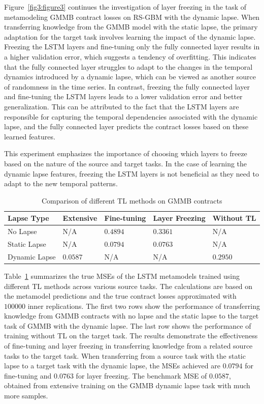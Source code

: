Figure~\ref{fig3:figure3} continues the investigation of layer freezing in the task of metamodeling GMMB contract losses on RS-GBM with the dynamic lapse. 
When transferring knowledge from the GMMB model with the static lapse, the primary adaptation for the target task involves learning the impact of the dynamic lapse.
Freezing the LSTM layers and fine-tuning only the fully connected layer results in a higher validation error, which suggests a tendency of overfitting.
This indicates that the fully connected layer struggles to adapt to the changes in the temporal dynamics introduced by a dynamic lapse, which can be viewed as another source of randomness in the time series.
In contrast, freezing the fully connected layer and fine-tuning the LSTM layers leads to a lower validation error and better generalization. 
This can be attributed to the fact that the LSTM layers are responsible for capturing the temporal dependencies associated with the dynamic lapse, and the fully connected layer predicts the contract losses based on these learned features.

This experiment emphasizes the importance of choosing which layers to freeze based on the nature of the source and target tasks. 
In the case of learning the dynamic lapse features, freezing the LSTM layers is not beneficial as they need to adapt to the new temporal patterns.

\begin{table}[ht!]
    \centering
    \begin{tabular}{lllll}
    \toprule
    \textbf{Lapse Type} & \textbf{Extensive} & \textbf{Fine-tuning} & \textbf{Layer Freezing} & \textbf{Without TL} \\
    \midrule
    No Lapse & N/A & $0.4894$ & $0.3361$ & N/A \\
    Static Lapse & N/A & $0.0794$ & $0.0763$ & N/A \\
    Dynamic Lapse & $0.0587$ &  N/A &  N/A & $0.2950$ \\
    \bottomrule
    \end{tabular}
    \caption{Comparison of different TL methods on GMMB contracts}
    \label{tab3:transfer_learning_results}
\end{table}

Table~\ref{tab3:transfer_learning_results} summarizes the true MSEs of the LSTM metamodels trained using different TL methods across various source tasks.
The calculations are based on the metamodel predictions and the true contract losses approximated with $\num{100000}$ inner replications.
The first two rows show the performance of transferring knowledge from GMMB contracts with no lapse and the static lapse to the target task of GMMB with the dynamic lapse.
The last row shows the performance of training without TL on the target task.
The results demonstrate the effectiveness of fine-tuning and layer freezing in transferring knowledge from a related source tasks to the target task. 
When transferring from a source task with the static lapse to a target task with the dynamic lapse, the MSEs achieved are $0.0794$ for fine-tuning and $0.0763$ for layer freezing.
The benchmark MSE of $0.0587$, obtained from extensive training on the GMMB dynamic lapse task with much more samples.

